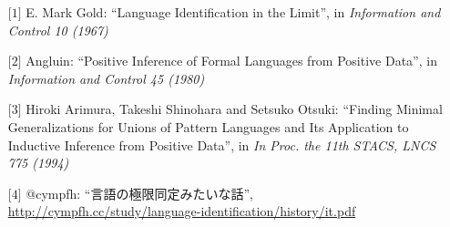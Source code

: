 \begin{enumerate}
    \item[$\lbrack 1 \rbrack$] E. Mark Gold: ``Language Identification in the Limit'', in \emph{Information and Control 10 (1967)}
    \item[$\lbrack 2 \rbrack$] Angluin: ``Positive Inference of Formal Languages from Positive Data'', in \emph{Information and Control 45 (1980)}
    \item[$\lbrack 3 \rbrack$] {Hiroki Arimura, Takeshi Shinohara and Setsuko Otsuki}: ``{Finding Minimal Generalizations for Unions of Pattern Languages and Its Application to Inductive Inference from Positive Data}'', in \emph{In Proc. the 11th STACS, LNCS 775 (1994)}
    \item[$\lbrack 4 \rbrack$] {\rm @cympfh}: ``言語の極限同定みたいな話'',\\
        \url{http://cympfh.cc/study/language-identification/history/it.pdf}
\end{enumerate}
